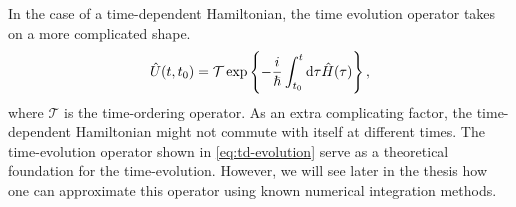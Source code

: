         In the case of a time-dependent Hamiltonian, the time evolution operator
        takes on a more complicated shape.
        \begin{align}
            \hat{U}(t, t_0) =
            \mathcal{T}\exp\left\{ 
                -\frac{i}{\hslash} \int_{t_0}^{t} \dd\tau
                \hat{H}(\tau)
             \right\},
            \label{eq:td-evolution}
        \end{align}
        where $\mathcal{T}$ is the time-ordering operator.
        As an extra complicating factor, the time-dependent Hamiltonian might
        not commute with itself at different times.
        The time-evolution operator shown in \autoref{eq:td-evolution} serve as
        a theoretical foundation for the time-evolution.
        However, we will see later in the thesis how one can approximate this
        operator using known numerical integration methods.


